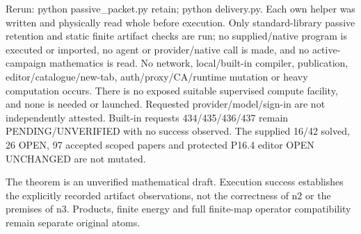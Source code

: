 \documentclass[11pt]{article}
\begin{document}
Rerun: python passive_packet.py retain; python delivery.py.
Each own helper was written and physically read whole before execution.
Only standard-library passive retention and static finite artifact checks
are run; no supplied/native program is executed or imported, no agent or
provider/native call is made, and no active-campaign mathematics is read.
No network, local/built-in compiler, publication, editor/catalogue/new-tab,
auth/proxy/CA/runtime mutation or heavy computation occurs. There is no
exposed suitable supervised compute facility, and none is needed or
launched. Requested provider/model/sign-in are not independently attested.
Built-in requests 434/435/436/437 remain PENDING/UNVERIFIED with no success
observed. The supplied 16/42 solved, 26 OPEN, 97 accepted scoped papers and
protected P16.4 editor OPEN UNCHANGED are not mutated.

The theorem is an unverified mathematical draft. Execution success
establishes the explicitly recorded artifact observations, not the
correctness of n2 or the premises of n3. Products, finite energy and full
finite-map operator compatibility remain separate original atoms.
\end{document}

